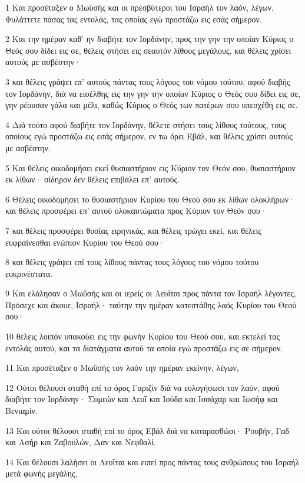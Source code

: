 \par 1 Και προσέταξεν ο Μωϋσής και οι πρεσβύτεροι του Ισραήλ τον λαόν, λέγων, Φυλάττετε πάσας τας εντολάς, τας οποίας εγώ προστάζω εις εσάς σήμερον.
\par 2 Και την ημέραν καθ' ην διαβήτε τον Ιορδάνην, προς την γην την οποίαν Κύριος ο Θεός σου δίδει εις σε, θέλεις στήσει εις σεαυτόν λίθους μεγάλους, και θέλεις χρίσει αυτούς με ασβέστην·
\par 3 και θέλεις γράψει επ' αυτούς πάντας τους λόγους του νόμου τούτου, αφού διαβής τον Ιορδάνην, διά να εισέλθης εις την γην την οποίαν Κύριος ο Θεός σου δίδει εις σε, γην ρέουσαν γάλα και μέλι, καθώς Κύριος ο Θεός των πατέρων σου υπεσχέθη εις σε.
\par 4 Διά τούτο αφού διαβήτε τον Ιορδάνην, θέλετε στήσει τους λίθους τούτους, τους οποίους εγώ προστάζω εις εσάς σήμερον, εν τω όρει Εβάλ, και θέλεις χρίσει αυτούς με ασβέστην.
\par 5 Και θέλεις οικοδομήσει εκεί θυσιαστήριον εις Κύριον τον Θεόν σου, θυσιαστήριον εκ λίθων· σίδηρον δεν θέλεις επιβάλει επ' αυτούς.
\par 6 Θέλεις οικοδομήσει το θυσιαστήριον Κυρίου του Θεού σου εκ λίθων ολοκλήρων· και θέλεις προσφέρει επ' αυτού ολοκαυτώματα προς Κύριον τον Θεόν σου·
\par 7 και θέλεις προσφέρει θυσίας ειρηνικάς, και θέλεις τρώγει εκεί, και θέλεις ευφραίνεσθαι ενώπιον Κυρίου του Θεού σου·
\par 8 και θέλεις γράψει επί τους λίθους πάντας τους λόγους του νόμου τούτου ευκρινέστατα.
\par 9 Και ελάλησαν ο Μωϋσής και οι ιερείς οι Λευΐται προς πάντα τον Ισραήλ λέγοντες, Πρόσεχε και άκουε, Ισραήλ· ταύτην την ημέραν κατεστάθης λαός Κυρίου του Θεού σου·
\par 10 θέλεις λοιπόν υπακούει εις την φωνήν Κυρίου του Θεού σου, και εκτελεί τας εντολάς αυτού, και τα διατάγματα αυτού τα οποία εγώ προστάζω εις σε σήμερον.
\par 11 Και προσέταξεν ο Μωϋσής τον λαόν την ημέραν εκείνην, λέγων,
\par 12 Ούτοι θέλουσι σταθή επί το όρος Γαριζίν διά να ευλογήσωσι τον λαόν, αφού διαβήτε τον Ιορδάνην· Συμεών και Λευΐ και Ιούδα και Ισσάχαρ και Ιωσήφ και Βενιαμίν.
\par 13 Και ούτοι θέλουσι σταθή επί το όρος Εβάλ διά να καταρασθώσι· Ρουβήν, Γαδ και Ασήρ και Ζαβουλών, Δαν και Νεφθαλί.
\par 14 Και θέλουσι λαλήσει οι Λευΐται και ειπεί προς πάντας τους ανθρώπους του Ισραήλ μετά φωνής μεγάλης,
